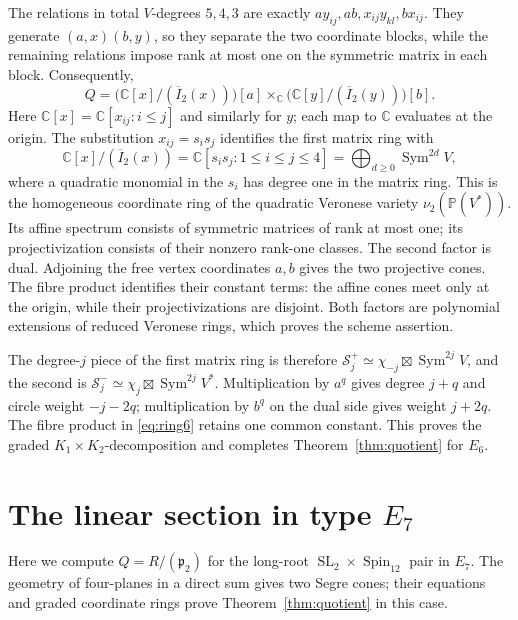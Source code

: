 \documentclass[11pt]{article}
\newcommand{\C}{\mathbb C}
\newcommand{\PP}{\mathbb P}
\newcommand{\Sym}{\operatorname{Sym}}
\newcommand{\SL}{\operatorname{SL}}
\newcommand{\Spin}{\operatorname{Spin}}
\newcommand{\fp}{\mathfrak p}
\theoremstyle{definition}
\numberwithin{equation}{section}
\begin{document}
The relations in total $V$-degrees $5,4,3$ are exactly
$ay_{ij},ab,x_{ij}y_{kl},bx_{ij}$. They generate $(a,x)(b,y)$,
so they separate the two coordinate blocks, while the remaining
relations impose rank at most one on the symmetric matrix in each
block. Consequently,
\begin{equation}\label{eq:ring6}
 Q=\bigl(\C[x]/(\overline I_2(x))\bigr)[a]\times_\C
       \bigl(\C[y]/(\overline I_2(y))\bigr)[b].
\end{equation}
Here $\C[x]=\C[x_{ij}:i\leq j]$ and similarly for $y$; each map
to $\C$ evaluates at the origin. The substitution $x_{ij}=s_is_j$
identifies the first matrix ring with
\[
 \C[x]/(\overline I_2(x))
   =\C[s_is_j:1\leq i\leq j\leq4]
   =\bigoplus_{d\geq0}\Sym^{2d}V,
\]
where a quadratic monomial in the $s_i$ has degree one in the matrix
ring. This is the homogeneous coordinate ring of the quadratic
Veronese variety $\nu_2(\PP(V^*))$. Its affine spectrum consists
of symmetric matrices of rank at most one; its projectivization
consists of their nonzero rank-one classes. The second factor is dual.
Adjoining the free vertex coordinates $a,b$ gives the two projective
cones. The fibre product identifies their constant terms: the affine
cones meet only at the origin, while their projectivizations are disjoint.
Both factors are polynomial extensions of reduced Veronese rings,
which proves the scheme assertion.

The degree-$j$ piece of the first matrix ring is therefore
$\mathcal S_j^+\simeq\chi_{-j}\boxtimes\Sym^{2j}V$, and the
second is $\mathcal S_j^-\simeq\chi_j\boxtimes\Sym^{2j}V^*$.
Multiplication by $a^q$ gives degree $j+q$ and circle weight $-j-2q$;
multiplication by $b^q$ on the dual side gives weight $j+2q$.
The fibre product in \eqref{eq:ring6} retains one common constant.
This proves the graded $K_1\times K_2$-decomposition and completes
Theorem~\ref{thm:quotient} for $E_6$.

\section{The linear section in type \texorpdfstring{$E_7$}{E7}}\label{sec:e7}
Here we compute $Q=R/(\fp_2)$ for the long-root
$\SL_2\times\Spin_{12}$ pair in $E_7$. The geometry of four-planes
in a direct sum gives two Segre cones; their equations and graded
coordinate rings prove Theorem~\ref{thm:quotient} in this case.
\end{document}
